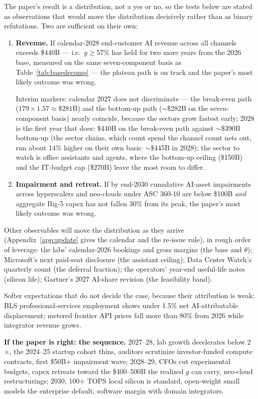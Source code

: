 \documentclass[11pt,letterpaper]{article}
\newcommand{\lead}[1]{{\color{leadwarm}\sffamily\bfseries #1}}
\begin{document}
The paper's result is a distribution, not a yes or no, so the tests below are stated as observations that would move the distribution decisively rather than as binary refutations. Two are sufficient on their own:
\begin{enumerate}
    \item \textbf{Revenue.} If calendar-2028 end-customer AI revenue across all channels exceeds \$440B --- i.e.\ $g\ge57\%$ has held for two more years from the 2026 base, measured on the same seven-component basis as Table~\ref{tab:basedecomp} --- the plateau path is on track and the paper's most likely outcome was wrong.

    Interim markers: calendar 2027 does not discriminate --- the break-even path ($179\times1.57\approx\$281$B) and the bottom-up path ($\sim$\$282B on the seven-component basis) nearly coincide, because the sectors grow fastest early; 2028 is the first year that does: \$440B on the break-even path against $\sim$\$390B bottom-up (the sector chains, which count spend the channel count nets out, run about 14\% higher on their own basis: $\sim$\$445B in 2028); the sector to watch is office assistants and agents, where the bottom-up ceiling (\$150B) and the IT-budget cap (\$270B) leave the most room to differ.
    \item \textbf{Impairment and retreat.} If by end-2030 cumulative AI-asset impairments across hyperscalers and neo-clouds under ASC 360-10 are below \$100B \emph{and} aggregate Big-5 capex has not fallen 30\% from its peak, the paper's most likely outcome was wrong.
\end{enumerate}
Other observables will move the distribution as they arrive (Appendix~\ref{app:update} gives the calendar and the re-issue rule), in rough order of leverage: the labs' calendar-2026 bookings and gross margins (the base and $\theta$); Microsoft's next paid-seat disclosure (the assistant ceiling); Data Center Watch's quarterly count (the deferral fraction); the operators' year-end useful-life notes (silicon life); Gartner's 2027 AI-share revision (the feasibility band).

Softer expectations that do not decide the case, because their attribution is weak: BLS professional-services employment shows under 1.5\% net AI-attributable displacement; metered frontier API prices fall more than 80\% from 2026 while integrator revenue grows.

\lead{If the paper is right: the sequence.} 2027--28, lab growth decelerates below 2$\times$, the 2024--25 startup cohort thins, auditors scrutinize investor-funded compute contracts, first \$50B+ impairment wave; 2028--29, CFOs cut experimental budgets, capex retreats toward the \$400--500B the realized $g$ can carry, neo-cloud restructurings; 2030, 100+ TOPS local silicon is standard, open-weight small models the enterprise default, software margin with domain integrators.
\end{document}
